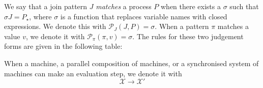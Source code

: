 We say that a join pattern $J$ \emph{matches} a process $P$ when there exists a
$\sigma$ such that $\sigma J = P_\star$, where $\sigma$ is a function that
replaces variable names with closed expressions. We denote this with
$\mathcal{P}_J(J,P) = \sigma$. When a pattern $\pi$ matches a value $v$, we
denote it with $\mathcal{P}_\pi(\pi,v) = \sigma$. The rules for these two
judgement forms are given in the following table:
\begin{figure}[!h]
\end{figure}

When a machine, a parallel composition of machines, or a synchronised system of
machines can make an evaluation step, we denote it with
\begin{equation*}
 \boxed{\mathcal{X} \longrightarrow \mathcal{X}'}
\end{equation*}

